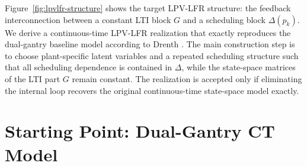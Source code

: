 \documentclass[11pt]{article}
\begin{document}
Figure~\ref{fig:lpvlfr-structure} shows the target LPV-LFR structure: the feedback interconnection between a constant LTI block $G$ and a scheduling block $\Delta(p_k)$. We derive a continuous-time LPV-LFR realization that exactly reproduces the
dual-gantry baseline model according to Drenth
\cite{drenth2025thesis}. The main construction step is to choose plant-specific latent variables and a repeated scheduling structure such that all scheduling dependence is contained in $\Delta$, while the state-space matrices of the LTI part $G$ remain constant. The realization is accepted only if eliminating the internal loop recovers the
original continuous-time state-space model exactly.


\section{Starting Point: Dual-Gantry CT Model}
\end{document}
